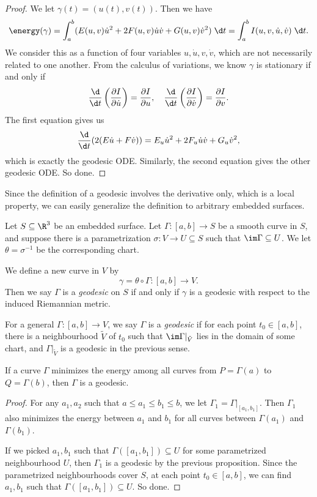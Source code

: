 \documentclass[a4paper]{article}
\begin{document}
\begin{proof}
  We let $\gamma(t) = (u(t), v(t))$. Then we have
  \[
    \energy (\gamma) = \int_a^b (E(u, v) \dot{u}^2 + 2F(u, v) \dot{u}\dot{v} + G(u, v) \dot{v}^2) \;\d t = \int_a^b I(u, v, \dot{u}, \dot{v}) \;\d t.
  \]
  We consider this as a function of four variables $u, \dot{u}, v, \dot{v}$, which are not necessarily related to one another. From the calculus of variations, we know $\gamma$ is stationary if and only if
  \[
    \frac{\d}{\d t} \left(\frac{\partial I}{\partial \dot{u}}\right) = \frac{\partial I}{\partial u},\quad \frac{\d}{\d t} \left(\frac{\partial I}{\partial \dot{v}}\right) = \frac{\partial I}{\partial v}.
  \]
  The first equation gives us
  \[
    \frac{\d}{\d t} (2 (E\dot{u} + F\dot{v})) = E_u \dot{u}^2 + 2F_u\dot{u}\dot{v} + G_u\dot{v}^2,
  \]
  which is exactly the geodesic ODE. Similarly, the second equation gives the other geodesic ODE. So done.
\end{proof}

Since the definition of a geodesic involves the derivative only, which is a local property, we can easily generalize the definition to arbitrary embedded surfaces.

\begin{defi}
  Let $S \subseteq \R^3$ be an embedded surface. Let $\Gamma: [a, b] \to S$ be a smooth curve in $S$, and suppose there is a parametrization $\sigma: V \to U \subseteq S$ such that $\im \Gamma \subseteq U$. We let $\theta = \sigma^{-1}$ be the corresponding chart.

  We define a new curve in $V$ by
  \[
    \gamma = \theta \circ \Gamma : [a, b] \to V.
  \]
  Then we say $\Gamma$ is a \emph{geodesic} on $S$ if and only if $\gamma$ is a geodesic with respect to the induced Riemannian metric.

  For a general $\Gamma: [a, b] \to V$, we say $\Gamma$ is a \emph{geodesic} if for each point $t_0 \in [a, b]$, there is a neighbourhood $\tilde{V}$ of $t_0$ such that $\im \Gamma|_{\tilde{V}}$ lies in the domain of some chart, and $\Gamma|_{\tilde{V}}$ is a geodesic in the previous sense.
\end{defi}

\begin{cor}
  If a curve $\Gamma$ minimizes the energy among all curves from $P = \Gamma(a)$ to $Q = \Gamma(b)$, then $\Gamma$ is a geodesic.
\end{cor}

\begin{proof}
  For any $a_1, a_2$ such that $a \leq a_1 \leq b_1 \leq b$, we let $\Gamma_1 = \Gamma|_{[a_1, b_1]}$. Then $\Gamma_1$ also minimizes the energy between $a_1$ and $b_1$ for all curves between $\Gamma(a_1)$ and $\Gamma(b_1)$.

  If we picked $a_1, b_1$ such that $\Gamma([a_1, b_1]) \subseteq U$ for some parametrized neighbourhood $U$, then $\Gamma_1$ is a geodesic by the previous proposition. Since the parametrized neighbourhoods cover $S$, at each point $t_0 \in [a, b]$, we can find $a_1, b_1$ such that $\Gamma([a_1, b_1]) \subseteq U$. So done.
\end{proof}
\end{document}
